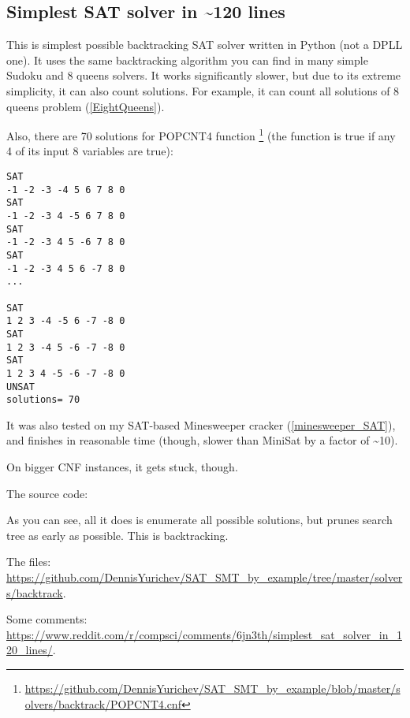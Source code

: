 \subsection{Simplest SAT solver in \textasciitilde{}120 lines}
\label{SAT_backtrack}

\renewcommand{\CURPATH}{solvers/backtrack}

This is simplest possible backtracking SAT solver written in Python (not a \ac{DPLL} one).
It uses the same backtracking algorithm you can find in many simple Sudoku and 8 queens solvers.
It works significantly slower, but due to its extreme simplicity, it can also count solutions.
For example, it can count all solutions of 8 queens problem (\ref{EightQueens}).

Also, there are 70 solutions for POPCNT4 function
\footnote{\url{https://github.com/DennisYurichev/SAT_SMT_by_example/blob/master/solvers/backtrack/POPCNT4.cnf}}
(the function is true if any 4 of its input 8 variables are true):

\begin{lstlisting}
SAT
-1 -2 -3 -4 5 6 7 8 0
SAT
-1 -2 -3 4 -5 6 7 8 0
SAT
-1 -2 -3 4 5 -6 7 8 0
SAT
-1 -2 -3 4 5 6 -7 8 0
...

SAT
1 2 3 -4 -5 6 -7 -8 0
SAT
1 2 3 -4 5 -6 -7 -8 0
SAT
1 2 3 4 -5 -6 -7 -8 0
UNSAT
solutions= 70
\end{lstlisting}

It was also tested on my SAT-based Minesweeper cracker (\ref{minesweeper_SAT}),
and finishes in reasonable time (though, slower than MiniSat by a factor of \textasciitilde{}10).

On bigger \ac{CNF} instances, it gets stuck, though.

The source code:



As you can see, all it does is enumerate all possible solutions, but prunes search tree as early as possible.
This is backtracking.

The files: \url{https://github.com/DennisYurichev/SAT_SMT_by_example/tree/master/solvers/backtrack}.

Some comments: \url{https://www.reddit.com/r/compsci/comments/6jn3th/simplest_sat_solver_in_120_lines/}.

